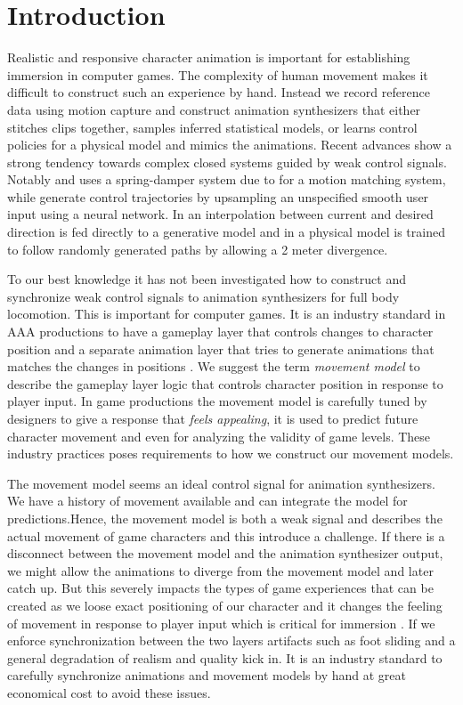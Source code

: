 \section{Introduction}
Realistic and responsive character animation is important for establishing immersion in computer games. The complexity of human movement makes it difficult to construct such an experience by hand. Instead we record reference data using motion capture and construct animation synthesizers that either stitches clips together, samples inferred statistical models, or learns control policies for a physical model and mimics the animations. Recent advances 
show a strong tendency towards complex closed systems guided by weak control signals. Notably \citep{holden.ea20} and \citep{Bergamin19} uses a spring-damper system due to \citep{kermse.04} for a motion matching system, while \citep{startke20} generate control trajectories by upsampling an unspecified smooth user input using a neural network. In \citep{zhang18} an interpolation between current and desired direction is fed directly to a generative model and in \citep{peng17} a physical model is trained to follow randomly generated paths by allowing a 2 meter divergence. 

To our best knowledge it has not been investigated how to construct and synchronize weak control signals to animation synthesizers for full body locomotion. This is important for computer games. It is an industry standard in AAA productions to have a gameplay layer that controls changes to character position and a separate animation layer that tries to generate animations that matches the changes in positions \citep{holden18}. We suggest the term \textit{movement model} to describe the gameplay layer logic that controls character position in response to player input. In game productions the movement model is carefully tuned by designers to give a response that \textit{feels appealing}, it is used to predict future character movement and even for analyzing the validity of game levels. These industry practices poses requirements to how we construct our movement models. 

The movement model seems an ideal control signal for animation synthesizers. We have a history of movement available and can integrate the model for predictions.Hence, the movement model is both a weak signal and describes the actual movement of game characters and this introduce a challenge. If there is a disconnect between the movement model and the animation synthesizer output, we might allow the animations to diverge from the movement model and later catch up. But this severely impacts the types of game experiences that can be created as we loose exact positioning of our character and it changes the feeling of movement in response to player input which is critical for immersion \citep{Jorg12}. If we enforce synchronization between the two layers artifacts such as foot sliding and a general degradation of realism and quality kick in. It is an industry standard to carefully synchronize animations and movement models by hand at great economical cost to avoid these issues. 

